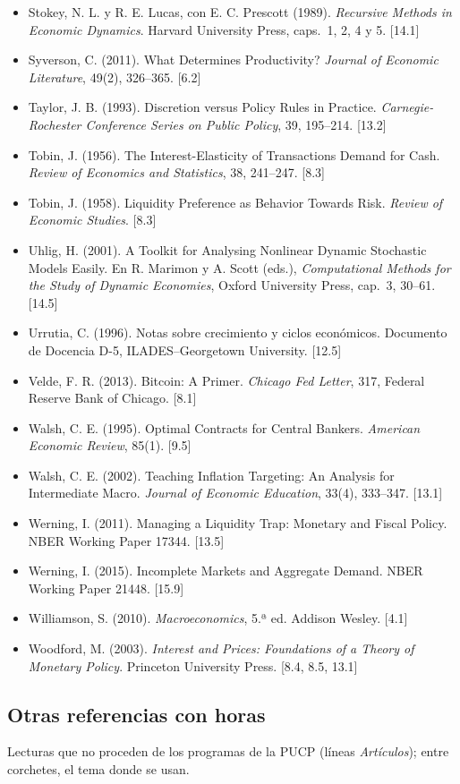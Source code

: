 \documentclass[11pt,a4paper]{article}
\begin{document}
{\begin{itemize}[leftmargin=1.4em,itemsep=1pt,label={}]
\item Stokey, N. L. y R. E. Lucas, con E. C. Prescott (1989). \emph{Recursive Methods in Economic Dynamics}. Harvard University Press, caps.~1, 2, 4 y 5. [14.1]
\item Syverson, C. (2011). What Determines Productivity? \emph{Journal of Economic Literature}, 49(2), 326--365. [6.2]
\item Taylor, J. B. (1993). Discretion versus Policy Rules in Practice. \emph{Carnegie-Rochester Conference Series on Public Policy}, 39, 195--214. [13.2]
\item Tobin, J. (1956). The Interest-Elasticity of Transactions Demand for Cash. \emph{Review of Economics and Statistics}, 38, 241--247. [8.3]
\item Tobin, J. (1958). Liquidity Preference as Behavior Towards Risk. \emph{Review of Economic Studies}. [8.3]
\item Uhlig, H. (2001). A Toolkit for Analysing Nonlinear Dynamic Stochastic Models Easily. En R. Marimon y A. Scott (eds.), \emph{Computational Methods for the Study of Dynamic Economies}, Oxford University Press, cap.~3, 30--61. [14.5]
\item Urrutia, C. (1996). Notas sobre crecimiento y ciclos económicos. Documento de Docencia D-5, ILADES--Georgetown University. [12.5]
\item Velde, F. R. (2013). Bitcoin: A Primer. \emph{Chicago Fed Letter}, 317, Federal Reserve Bank of Chicago. [8.1]
\item Walsh, C. E. (1995). Optimal Contracts for Central Bankers. \emph{American Economic Review}, 85(1). [9.5]
\item Walsh, C. E. (2002). Teaching Inflation Targeting: An Analysis for Intermediate Macro. \emph{Journal of Economic Education}, 33(4), 333--347. [13.1]
\item Werning, I. (2011). Managing a Liquidity Trap: Monetary and Fiscal Policy. NBER Working Paper 17344. [13.5]
\item Werning, I. (2015). Incomplete Markets and Aggregate Demand. NBER Working Paper 21448. [15.9]
\item Williamson, S. (2010). \emph{Macroeconomics}, 5.ª ed. Addison Wesley. [4.1]
\item Woodford, M. (2003). \emph{Interest and Prices: Foundations of a Theory of Monetary Policy}. Princeton University Press. [8.4, 8.5, 13.1]
\end{itemize}
}

\subsection*{Otras referencias con horas}
Lecturas que no proceden de los programas de la PUCP (líneas \emph{Artículos});
entre corchetes, el tema donde se usan.
\end{document}
